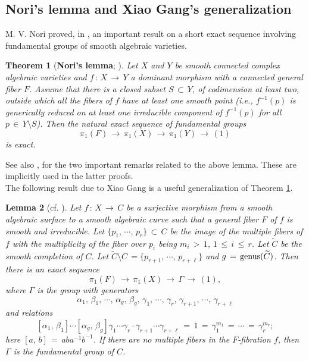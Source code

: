 \documentclass[12pt,reqno,twoside]{amsart}
\newtheorem{theorem}{Theorem}[section]
\newtheorem{lemma}[theorem]{Lemma}
\theoremstyle{definition}
\numberwithin{equation}{section}
\newcommand{\wt}{\widetilde}
\begin{document}
\subsection{Nori's lemma and Xiao Gang's generalization}

M. V. Nori proved, in \cite{Nor1983}, an important result on a short exact sequence involving fundamental groups of smooth algebraic varieties.

\begin{theorem}[{{\bf Nori's lemma}; \cite[Lemma 1.5]{Nor1983}}]\label{Nori's Lemma}
Let $X$ and $Y$ be smooth connected complex algebraic varieties and $f\,:\, X
\,\longrightarrow\, Y$ a dominant morphism with a connected general fiber $F$. Assume that there is a closed subset
$S\, \subset\, Y$, of codimension at least two, outside which all the fibers of $f$ have at least one smooth point (i.e., $f^{-1}(p)$ is generically reduced on at least
one irreducible component of $f^{-1}(p)$ for all $p \,\in\, Y\setminus S$). 
Then the natural exact sequence of fundamental groups $$\pi_1(F)\,\longrightarrow\, \pi_1(X) \,\longrightarrow\,\pi_1(Y)\,\longrightarrow\, (1)$$
is exact.
\end{theorem}

See also \cite[Remark 3.13, 3.14]{GGH2023}, for the two important remarks related to the above lemma. These are implicitly used in the latter proofs.\\

The following result due to Xiao Gang is a useful generalization of Theorem \ref{Nori's Lemma}.

\begin{lemma}[{cf. \cite[Lemma 2]{Gan1991}}]\label{Lem: Gang's Generalization}
Let $f \,:\, X\, \longrightarrow\, C$ be a surjective morphism from a smooth algebraic surface to a smooth algebraic curve
such that a general fiber $F$ of $f$ is smooth and irreducible. Let $\{p_1,\,\cdots,\,p_r\}\, \subset\, C$ be the image of the
multiple fibers of $f$ with the multiplicity of the fiber over $p_i$ being $m_i\, >\, 1$, $1\, \leq\, i\, \leq\, r$.
Let $\wt{C}$ be the smooth completion of $C$. Let $\wt{C}\setminus C\,=\{p_{r+1},\,\cdots,\, p_{r+\ell}\}$ and
$g\, =\, {\rm genus}(\wt{C})$. Then there is an exact sequence
$$\pi_1(F)\, \longrightarrow\, \pi_1(X ) \, \longrightarrow\, \Gamma \, \longrightarrow\, (1),$$
where $\Gamma$ is the group with generators $$\alpha_1,\, \beta_1, \,\cdots, \,\alpha_g,\, \beta_g,\, \gamma_1,\,\cdots,
\, \gamma_r,\,\gamma_{r+1},\, \cdots,\, \gamma_{r+\ell}$$ and relations
$$[\alpha_1,\, \beta_1]\cdots [\alpha_g, \,\beta_g] \gamma_1\cdots \gamma_r \cdot \gamma_{r +1}\cdots \gamma_{r +\ell}
\,=\, 1 \,= \,\gamma_1^{m_1}\,=\, \cdots \,=\, \gamma_r^{m_r};$$
here $[a, \,b]\,=\, aba^{-1}b^{-1}$. If there are no multiple fibers in the $F$-fibration $f$, then
$\Gamma$ is the fundamental group of $C$.
\end{lemma}
\end{document}
